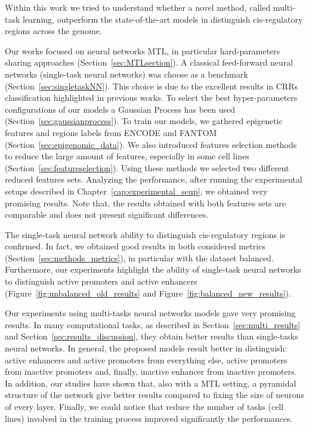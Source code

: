 Within this work we tried to understand whether a novel method, called multi-task learning, outperform the state-of-the-art models in distinguish cis-regulatory regions across the genome. 

Our works focused on neural networks MTL, in particular hard-parameters sharing approaches (Section~\ref{sec:MTLsection}). A classical feed-forward neural networks (single-task neural networks) was choose as a benchmark (Section~\ref{sec:singletaskNN}). This choice is due to the excellent results in CRRs classification highlighted in previous works. To select the best hyper-parameters configurations of our models a Gaussian Process has been used (Section~\ref{sec:gaussianprocess}).
To train our models, we gathered epigenetic features and regions labels from ENCODE and FANTOM (Section~\ref{sec:epigenomic_data}). We also introduced features selection methods to reduce the large amount of features, especially in some cell lines (Section~\ref{sec:featureselection}). Using these methods we selected two different reduced features sets. 
Analyzing the performance, after running the experimental setups described in Chapter~\ref{cap:experimental_seup}, we obtained very promising results. Note that, the results obtained with both features sets are comparable and does not present significant differences. 

The single-task neural network ability to distinguish cis-regulatory regions is confirmed. In fact, we obtained good results in both considered metrics (Section~\ref{sec:methods_metrics}), in particular with the dataset balanced. Furthermore, our experiments highlight the ability of single-task neural networks to distinguish active promoters and active enhancers (Figure~\ref{fig:unbalanced_old_results} and Figure~\ref{fig:balanced_new_results}).

Our experiments using multi-tasks neural networks models gave very promising results. In many computational tasks, as described in Section~\ref{sec:multi_results} and Section~\ref{sec:results_discussion}, they obtain better results than single-tasks neural networks.
In general, the proposed models result better in distinguish: active enhancers and active promoters from everything else, active promoters from inactive promoters and, finally, inactive enhancer from inactive promoters. In addition, our studies have shown that, also with a MTL setting, a pyramidal structure of the network give better results compared to fixing the size of neurons of every layer. 
Finally, we could notice that reduce the number of tasks (cell lines) involved in the training process improved significantly the performances. 

